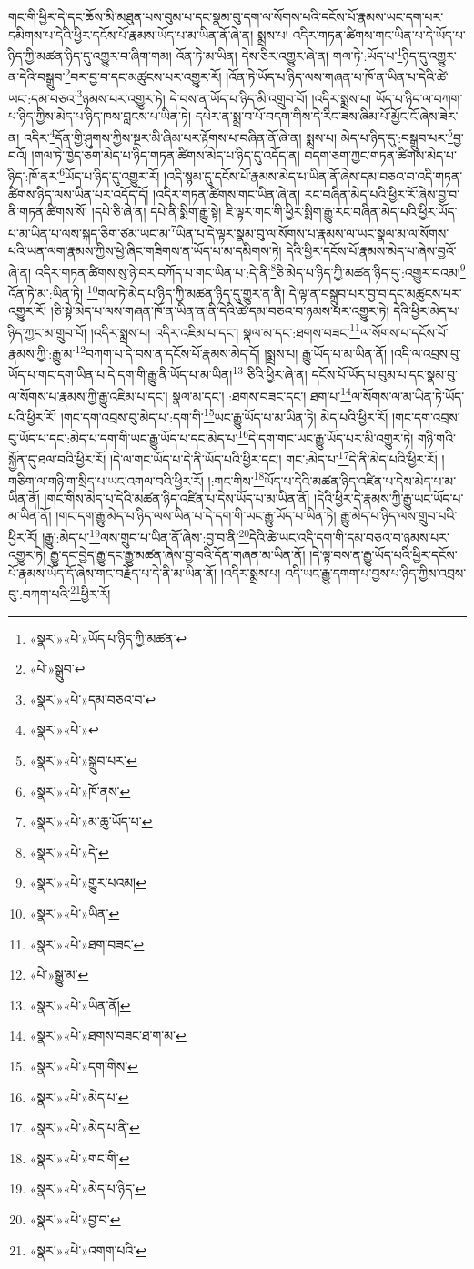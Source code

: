 གང་གི་ཕྱིར་དེ་དང་ཆོས་མི་མཐུན་པས་བུམ་པ་དང་སྣམ་བུ་དག་ལ་སོགས་པའི་དངོས་པོ་རྣམས་ཡང་དག་པར་དམིགས་པ་དེའི་ཕྱིར་དངོས་པོ་རྣམས་ཡོད་པ་མ་ཡིན་ནོ་ཞེ་ན། སྨྲས་པ། འདིར་གཏན་ཚིགས་གང་ཡིན་པ་དེ་ཡོད་པ་ཉིད་ཀྱི་མཚན་ཉིད་དུ་འགྱུར་བ་ཞིག་གམ། འོན་ཏེ་མ་ཡིན། དེས་ཅིར་འགྱུར་ཞེ་ན། གལ་ཏེ་:ཡོད་པ་\footnote{«སྣར་»«པེ་»ཡོད་པ་ཉིད་ཀྱི་མཚན་}ཉིད་དུ་འགྱུར་ན་དེའི་བསྒྲུབ་\footnote{«པེ་»སྒྲུབ་}བར་བྱ་བ་དང་མཚུངས་པར་འགྱུར་རོ། །འོན་ཏེ་ཡོད་པ་ཉིད་ལས་གཞན་པ་ཁོ་ན་ཡིན་པ་དེའི་ཚེ་ཡང་:དམ་བཅའ་\footnote{«སྣར་»«པེ་»དམ་བཅའ་བ་}ཉམས་པར་འགྱུར་ཏེ། དེ་བས་ན་ཡོད་པ་ཉིད་མི་འགྲུབ་བོ། །འདིར་སྨྲས་པ། ཡོད་པ་ཉིད་ལ་བཀག་པ་ཉིད་ཀྱིས་མེད་པ་ཉིད་ཁས་བླངས་པ་ཡིན་ཏེ། དཔེར་ན་སྨྲ་བ་པོ་བདག་གིས་དེ་རིང་ཟས་ཞིམ་པོ་མྱོང་ངོ་ཞེས་ཟེར་ན། འདིར་\footnote{«སྣར་»«པེ་»}དོན་གྱི་ཤུགས་ཀྱིས་སྔར་མི་ཞིམ་པར་རྟོགས་པ་བཞིན་ནོ་ཞེ་ན། སྨྲས་པ། མེད་པ་ཉིད་དུ་:བསྒྲུབ་པར་\footnote{«སྣར་»«པེ་»སྒྲུབ་པར་}བྱ་བའོ། །གལ་ཏེ་ཁྱེད་ཅག་མེད་པ་ཉིད་གཏན་ཚིགས་མེད་པ་ཉིད་དུ་འདོད་ན། བདག་ཅག་ཀྱང་གཏན་ཚིགས་མེད་པ་ཉིད་:ཁོ་ནར་\footnote{«སྣར་»«པེ་»ཁོ་ནས་}ཡོད་པ་ཉིད་དུ་འགྱུར་རོ། །འདི་སྙམ་དུ་དངོས་པོ་རྣམས་མེད་པ་ཡིན་ནོ་ཞེས་དམ་བཅའ་བ་འདི་གཏན་ཚིགས་ཉིད་ལས་ཡིན་པར་འདོད་དོ། །འདིར་གཏན་ཚིགས་གང་ཡིན་ཞེ་ན། རང་བཞིན་མེད་པའི་ཕྱིར་རོ་ཞེས་བྱ་བ་ནི་གཏན་ཚིགས་སོ། །དཔེ་ཅི་ཞེ་ན། དཔེ་ནི་སྨིག་རྒྱུ་སྟེ། ཇི་ལྟར་གང་གི་ཕྱིར་སྨིག་རྒྱུ་རང་བཞིན་མེད་པའི་ཕྱིར་ཡོད་པ་མ་ཡིན་པ་ལས་སྐད་ཅིག་ཙམ་ཡང་མ་\footnote{«སྣར་»«པེ་»མ་ཆུ་ཡོད་པ་}ཡིན་པ་དེ་ལྟར་སྣམ་བུ་ལ་སོགས་པ་རྣམས་ལ་ཡང་སྣལ་མ་ལ་སོགས་པའི་ཡན་ལག་རྣམས་ཀྱིས་ཕྱེ་ཞིང་གཟིགས་ན་ཡོད་པ་མ་དམིགས་ཏེ། དེའི་ཕྱིར་དངོས་པོ་རྣམས་མེད་པ་ཞེས་བྱའོ་ཞེ་ན། འདིར་གཏན་ཚིགས་སུ་ཉེ་བར་བཀོད་པ་གང་ཡིན་པ་:དེ་ནི་\footnote{«སྣར་»«པེ་»དེ་}ཅི་མེད་པ་ཉིད་ཀྱི་མཚན་ཉིད་དུ་:འགྱུར་བའམ།\footnote{«སྣར་»«པེ་»གྱུར་པའམ།} འོན་ཏེ་མ་:ཡིན་ཏེ། \footnote{«སྣར་»«པེ་»ཡིན་}གལ་ཏེ་མེད་པ་ཉིད་ཀྱི་མཚན་ཉིད་དུ་གྱུར་ན་ནི། དེ་ལྟ་ན་བསྒྲུབ་པར་བྱ་བ་དང་མཚུངས་པར་འགྱུར་རོ། །ཅི་སྟེ་མེད་པ་ལས་གཞན་ཁོ་ན་ཡིན་ན་ནི་དེའི་ཚེ་དམ་བཅའ་བ་ཉམས་པར་འགྱུར་ཏེ། དེའི་ཕྱིར་མེད་པ་ཉིད་ཀྱང་མ་གྲུབ་བོ། །འདིར་སྨྲས་པ། འདིར་འཇིམ་པ་དང་། སྣལ་མ་དང་:ཐགས་བཟང་\footnote{«སྣར་»«པེ་»ཐག་བཟང་}ལ་སོགས་པ་དངོས་པོ་རྣམས་ཀྱི་:རྒྱུ་མ་\footnote{«པེ་»སྒྱུ་མ་}བཀག་པ་དེ་བས་ན་དངོས་པོ་རྣམས་མེད་དོ། །སྨྲས་པ། རྒྱུ་ཡོད་པ་མ་ཡིན་ནོ། །འདི་ལ་འབྲས་བུ་ཡོད་པ་གང་དག་ཡིན་པ་དེ་དག་གི་རྒྱུ་ནི་ཡོད་པ་མ་ཡིན།\footnote{«སྣར་»«པེ་»ཡིན་ནོ།} ཅིའི་ཕྱིར་ཞེ་ན། དངོས་པོ་ཡོད་པ་བུམ་པ་དང་སྣམ་བུ་ལ་སོགས་པ་རྣམས་ཀྱི་རྒྱུ་འཇིམ་པ་དང་། སྣལ་མ་དང་། :ཐགས་བཟང་དང་། ཐག་པ་\footnote{«སྣར་»«པེ་»ཐགས་བཟང་ཐ་ག་མ་}ལ་སོགས་ལ་མ་ཡིན་ཏེ་ཡོད་པའི་ཕྱིར་རོ། །གང་དག་འབྲས་བུ་མེད་པ་:དག་གི་\footnote{«སྣར་»«པེ་»དག་གིས་}ཡང་རྒྱུ་ཡོད་པ་མ་ཡིན་ཏེ། མེད་པའི་ཕྱིར་རོ། །གང་དག་འབྲས་བུ་ཡོད་པ་དང་:མེད་པ་དག་གི་ཡང་རྒྱུ་ཡོད་པ་དང་མེད་པ་\footnote{«སྣར་»«པེ་»མེད་པ་}དེ་དག་གང་ཡང་རྒྱུ་ཡོད་པར་མི་འགྱུར་ཏེ། གཉི་གའི་སྐྱོན་དུ་ཐལ་བའི་ཕྱིར་རོ། །དེ་ལ་གང་ཡོད་པ་དེ་ནི་ཡོད་པའི་ཕྱིར་དང་། གང་:མེད་པ་\footnote{«སྣར་»«པེ་»མེད་པ་ནི་}དེ་ནི་མེད་པའི་ཕྱིར་རོ། །གཅིག་ལ་གཉི་ག་སྲིད་པ་ཡང་འགལ་བའི་ཕྱིར་རོ། །:གང་གིས་\footnote{«སྣར་»«པེ་»གང་གི་}ཡོད་པ་དེའི་མཚན་ཉིད་འཛིན་པ་དེས་མེད་པ་མ་ཡིན་ནོ། །གང་གིས་མེད་པ་དེའི་མཚན་ཉིད་འཛིན་པ་དེས་ཡོད་པ་མ་ཡིན་ནོ། །དེའི་ཕྱིར་དེ་རྣམས་ཀྱི་རྒྱུ་ཡང་ཡོད་པ་མ་ཡིན་ནོ། །གང་དག་རྒྱུ་མེད་པ་ཉིད་ལས་ཡིན་པ་དེ་དག་གི་ཡང་རྒྱུ་ཡོད་པ་ཡིན་ཏེ། རྒྱུ་མེད་པ་ཉིད་ལས་གྲུབ་པའི་ཕྱིར་རོ། །རྒྱུ་:མེད་པ་\footnote{«སྣར་»«པེ་»མེད་པ་ཉིད་}ལས་གྲུབ་པ་ཡིན་ནོ་ཞེས་:བྱ་བ་ནི་\footnote{«སྣར་»«པེ་»བྱ་བ་}དེའི་ཚེ་ཡང་འདི་དག་གི་དམ་བཅའ་བ་ཉམས་པར་འགྱུར་ཏེ། རྒྱུ་དང་བྱེད་རྒྱུ་དང་རྒྱུ་མཚན་ཞེས་བྱ་བའི་དོན་གཞན་མ་ཡིན་ནོ། །དེ་ལྟ་བས་ན་རྒྱུ་ཡོད་པའི་ཕྱིར་དངོས་པོ་རྣམས་ཡོད་དོ་ཞེས་གང་བརྗོད་པ་དེ་ནི་མ་ཡིན་ནོ། །འདིར་སྨྲས་པ། འདི་ཡང་རྒྱུ་དགག་པ་བྱས་པ་ཉིད་ཀྱིས་འབྲས་བུ་:བཀག་པའི་\footnote{«སྣར་»«པེ་»འགག་པའི་}ཕྱིར་རོ། 